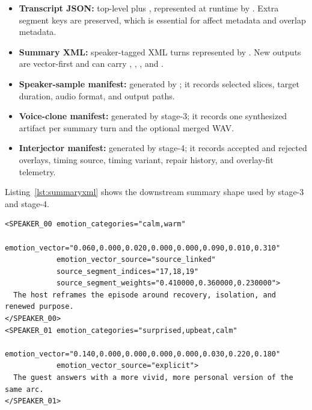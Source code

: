\begin{itemize}
  \item \textbf{Transcript JSON:} top-level  plus , represented at runtime by . Extra segment keys are preserved, which is essential for affect metadata and overlap metadata.
  \item \textbf{Summary XML:} speaker-tagged XML turns represented by . New outputs are vector-first and can carry , , , and .
  \item \textbf{Speaker-sample manifest:} generated by ; it records selected slices, target duration, audio format, and output paths.
  \item \textbf{Voice-clone manifest:} generated by stage-3; it records one synthesized artifact per summary turn and the optional merged WAV.
  \item \textbf{Interjector manifest:} generated by stage-4; it records accepted and rejected overlays, timing source, timing variant, repair history, and overlay-fit telemetry.
\end{itemize}

Listing~\ref{lst:summaryxml} shows the downstream summary shape used by stage-3 and stage-4.

\begin{lstlisting}[style=cfxml,caption={Representative summary XML shape used downstream by stage-3 and stage-4. Adapted from \codepath{src/card_framework/shared/summary_xml.py}.},label={lst:summaryxml}]
<SPEAKER_00 emotion_categories="calm,warm"
            emotion_vector="0.060,0.000,0.020,0.000,0.000,0.090,0.010,0.310"
            emotion_vector_source="source_linked"
            source_segment_indices="17,18,19"
            source_segment_weights="0.410000,0.360000,0.230000">
  The host reframes the episode around recovery, isolation, and renewed purpose.
</SPEAKER_00>
<SPEAKER_01 emotion_categories="surprised,upbeat,calm"
            emotion_vector="0.140,0.000,0.000,0.000,0.000,0.030,0.220,0.180"
            emotion_vector_source="explicit">
  The guest answers with a more vivid, more personal version of the same arc.
</SPEAKER_01>
\end{lstlisting}

